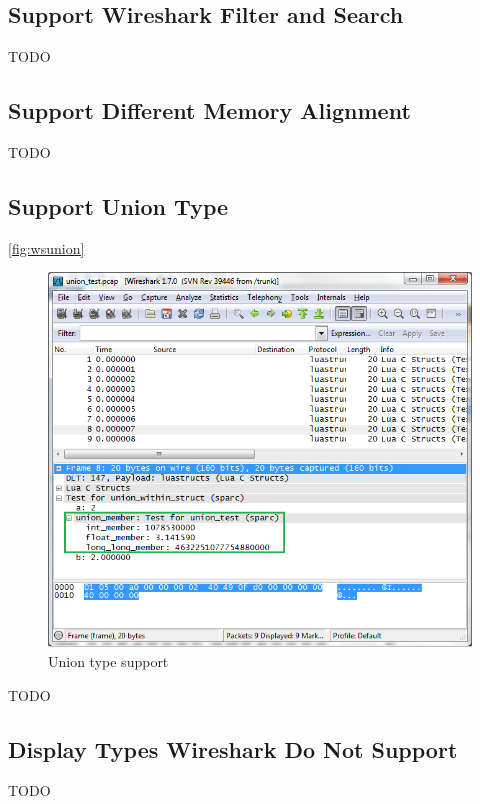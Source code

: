 \subsection{Support Wireshark Filter and Search}
TODO

\subsection{Support Different Memory Alignment}
TODO

\subsection{Support Union Type}
\autoref{fig:wsunion}

\begin{figure}[ht]
	\center
	\includegraphics[width=\textwidth]{./sprints/img/wireshark_union}
	\caption{Union type support\label{fig:wsunion}}
\end{figure}

%

TODO

\subsection{Display Types Wireshark Do Not Support}
TODO

